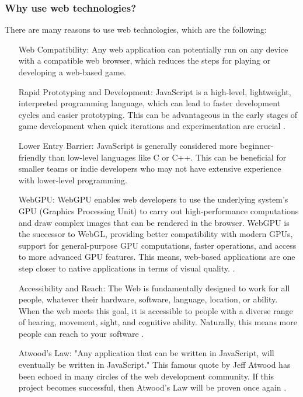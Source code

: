 \documentclass{article}
\begin{document}
\subsubsection{Why use web technologies?}
There are many reasons to use web technologies, which are the following:

\begin{itemize}
    \item[Web Compatibility:] Any web application can potentially run on any device with a compatible web browser, which reduces the steps for playing or developing a web-based game.
    \item[Rapid Prototyping and Development:] JavaScript is a high-level, lightweight, interpreted programming language, which can lead to faster development cycles and easier prototyping. This can be advantageous in the early stages of game development when quick iterations and experimentation are crucial \cite{javascript}.
    \item[Lower Entry Barrier:] JavaScript is generally considered more beginner-friendly than low-level languages like C or C++. This can be beneficial for smaller teams or indie developers who may not have extensive experience with lower-level programming.
    \item[WebGPU:] WebGPU enables web developers to use the underlying system's GPU (Graphics Processing Unit) to carry out high-performance computations and draw complex images that can be rendered in the browser. WebGPU is the successor to WebGL, providing better compatibility with modern GPUs, support for general-purpose GPU computations, faster operations, and access to more advanced GPU features. This means, web-based applications are one step closer to native applications in terms of visual quality. \cite{webgpu}.
    \item[Accessibility and Reach:] The Web is fundamentally designed to work for all people, whatever their hardware, software, language, location, or ability. When the web meets this goal, it is accessible to people with a diverse range of hearing, movement, sight, and cognitive ability. Naturally, this means more people can reach to your software \cite{accessibility}.
    \item[Atwood's Law:] "Any application that can be written in JavaScript, will eventually be written in JavaScript." This famous quote by Jeff Atwood has been echoed in many circles of the web development community. If this project becomes successful, then Atwood's Law will be proven once again \cite{atwood}.
\end{itemize}
\end{document}
